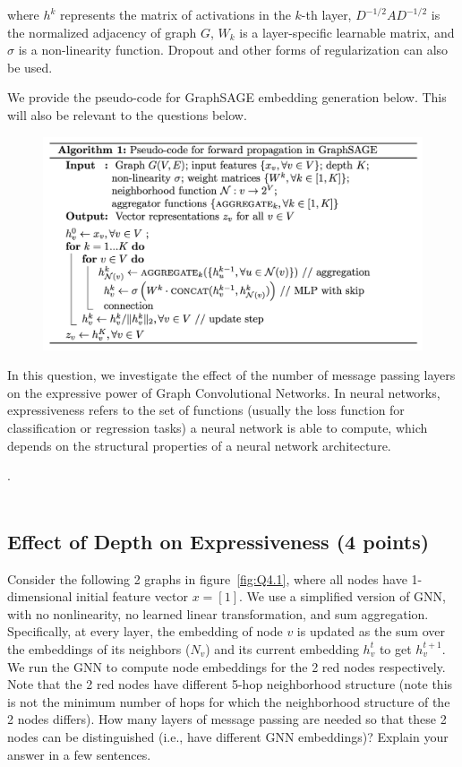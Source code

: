 \documentclass{article}
\numberwithin{figure}{section}
\begin{document}
where $h^k$ represents the matrix of activations in the $k$-th layer, $D^{-1/2}AD^{-1/2}$ is the normalized adjacency of graph $G$, $W_k$ is a layer-specific learnable matrix, and $\sigma$ is a non-linearity function. Dropout and other forms of regularization can also be used.

We provide the pseudo-code for GraphSAGE embedding generation below. This will also be relevant to the questions below.

\begin{figure}[H]
\centering
  \includegraphics[width=1\columnwidth]{CS224W_Homework1/algorithm.png}
\end{figure}

In this question, we investigate the effect of the number of message passing layers on the expressive power of Graph Convolutional Networks. In neural networks, expressiveness refers to the set of functions (usually the loss function for classification or regression tasks) a neural network is able to compute, which depends on the structural properties of a neural network architecture.

.\\\\
\subsection{Effect of Depth on Expressiveness (4 points)}

Consider the following 2 graphs in figure~\ref{fig:Q4.1}, where all nodes have 1-dimensional initial feature vector $x = [1]$. We use a simplified version of GNN, with no nonlinearity,
no learned linear transformation, and sum aggregation. Specifically, at every
layer, the embedding of node $v$ is updated as the sum over the embeddings of
its neighbors ($N_v$) and its current embedding $h^t_v$ to get $h^{t+1}_v$. We run the GNN
to compute node embeddings for the 2 red nodes respectively. Note that the 2 red nodes have different 5-hop neighborhood structure (note this is not the minimum number of hops for which the neighborhood structure of the 2 nodes differs). How many layers of message passing are needed so that these 2 nodes can be distinguished (i.e., have different GNN embeddings)? Explain your answer in a few sentences.
\end{document}
